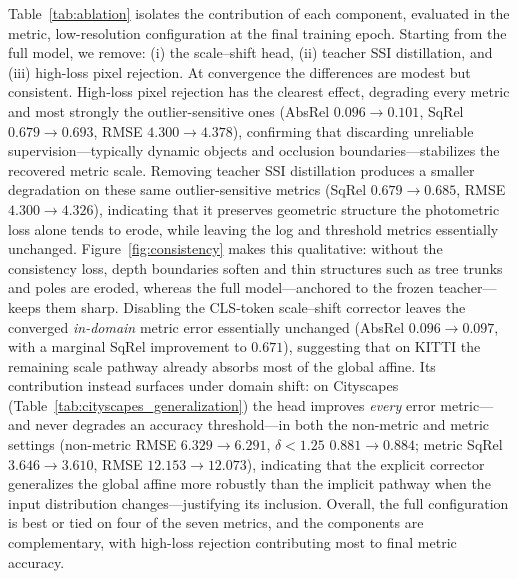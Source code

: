 Table~\ref{tab:ablation} isolates the contribution of each component, evaluated in the metric, low-resolution configuration at the final training epoch. Starting from the full model, we remove: (i) the scale--shift head, (ii) teacher SSI distillation, and (iii) high-loss pixel rejection. At convergence the differences are modest but consistent. High-loss pixel rejection has the clearest effect, degrading every metric and most strongly the outlier-sensitive ones (AbsRel \(0.096\!\rightarrow\!0.101\), SqRel \(0.679\!\rightarrow\!0.693\), RMSE \(4.300\!\rightarrow\!4.378\)), confirming that discarding unreliable supervision---typically dynamic objects and occlusion boundaries---stabilizes the recovered metric scale. Removing teacher SSI distillation produces a smaller degradation on these same outlier-sensitive metrics (SqRel \(0.679\!\rightarrow\!0.685\), RMSE \(4.300\!\rightarrow\!4.326\)), indicating that it preserves geometric structure the photometric loss alone tends to erode, while leaving the log and threshold metrics essentially unchanged. Figure~\ref{fig:consistency} makes this qualitative: without the consistency loss, depth boundaries soften and thin structures such as tree trunks and poles are eroded, whereas the full model---anchored to the frozen teacher---keeps them sharp. Disabling the CLS-token scale--shift corrector leaves the converged \emph{in-domain} metric error essentially unchanged (AbsRel \(0.096\!\rightarrow\!0.097\), with a marginal SqRel improvement to \(0.671\)), suggesting that on KITTI the remaining scale pathway already absorbs most of the global affine. Its contribution instead surfaces under domain shift: on Cityscapes (Table~\ref{tab:cityscapes_generalization}) the head improves \emph{every} error metric---and never degrades an accuracy threshold---in both the non-metric and metric settings (non-metric RMSE \(6.329\!\rightarrow\!6.291\), \(\delta{<}1.25\) \(0.881\!\rightarrow\!0.884\); metric SqRel \(3.646\!\rightarrow\!3.610\), RMSE \(12.153\!\rightarrow\!12.073\)), indicating that the explicit corrector generalizes the global affine more robustly than the implicit pathway when the input distribution changes---justifying its inclusion. Overall, the full configuration is best or tied on four of the seven metrics, and the components are complementary, with high-loss rejection contributing most to final metric accuracy.


